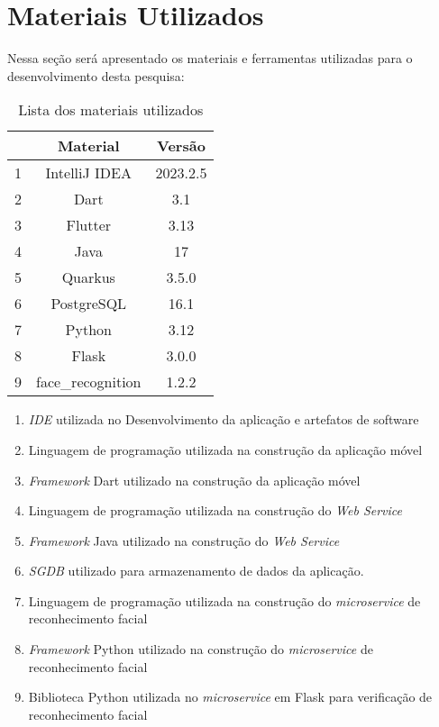 \section{Materiais Utilizados}\label{sec:materiais-utilizados}
Nessa seção será apresentado os materiais e ferramentas utilizadas para o desenvolvimento desta pesquisa:

\begin{table}[H]
    \centering
    \caption{Lista dos materiais utilizados}
    \label{tab:materiais-utilizados}
    \begin{tabular}{|c|c|c|}
        \hline
        & \textbf{Material} & \textbf{Versão} \\ \hline
        1 & IntelliJ IDEA     & 2023.2.5        \\ \hline
        2 & Dart              & 3.1             \\ \hline
        3 & Flutter           & 3.13            \\ \hline
        4 & Java              & 17              \\ \hline
        5 & Quarkus           & 3.5.0           \\ \hline
        6 & PostgreSQL        & 16.1            \\ \hline
        7 & Python            & 3.12            \\ \hline
        8 & Flask             & 3.0.0           \\ \hline
        9 & face\_recognition & 1.2.2           \\ \hline
    \end{tabular}
\end{table}

\begin{enumerate}
    \item \textit{IDE} utilizada no Desenvolvimento da aplicação e artefatos de software
    \item Linguagem de programação utilizada na construção da aplicação móvel
    \item \textit{Framework} Dart utilizado na construção da aplicação móvel
    \item Linguagem de programação utilizada na construção do \textit{Web Service}
    \item \textit{Framework} Java utilizado na construção do \textit{Web Service}
    \item \textit{SGDB} utilizado para armazenamento de dados da aplicação.
    \item Linguagem de programação utilizada na construção do \textit{microservice} de reconhecimento facial
    \item \textit{Framework} Python utilizado na construção do \textit{microservice} de reconhecimento facial
    \item Biblioteca Python utilizada no \textit{microservice} em Flask para verificação de reconhecimento facial
\end{enumerate}
